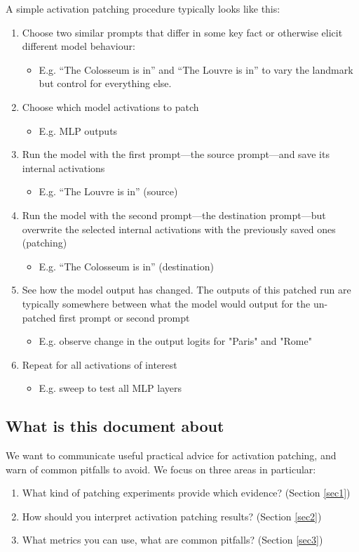 \documentclass[nonatbib]{article}
\begin{document}
A simple activation patching procedure typically looks like this:
\begin{enumerate}
  \item Choose two similar prompts that differ in some key fact or otherwise elicit different model behaviour:
  \begin{itemize}
    \item[] E.g. “The Colosseum is in” and “The Louvre is in” to vary the landmark but control for everything else.
  \end{itemize}
  \item Choose which model activations to patch
  \begin{itemize}
    \item[] E.g. MLP outputs
  \end{itemize}
  \item Run the model with the first prompt—the source prompt—and save its internal activations
  \begin{itemize}
    \item[] E.g. “The Louvre is in” (source)
  \end{itemize}
  \item Run the model with the second prompt—the destination prompt—but overwrite the selected internal activations with the previously saved ones (patching)
  \begin{itemize}
    \item[] E.g. “The Colosseum is in” (destination)
  \end{itemize}
  \item See how the model output has changed. The outputs of this patched run are typically somewhere between what the model would output for the un-patched first prompt or second prompt
  \begin{itemize}
    \item[] E.g. observe change in the output logits for "Paris" and "Rome"
  \end{itemize}
  \item Repeat for all activations of interest
  \begin{itemize}
    \item[] E.g. sweep to test all MLP layers
  \end{itemize}
\end{enumerate}

\subsection{What is this document about}
We want to communicate useful practical advice for activation patching, and warn of common pitfalls to avoid. We focus on three areas in particular:
\begin{enumerate}
    \item What kind of patching experiments provide which evidence? (Section \ref{sec1})
    \item How should you interpret activation patching results? (Section \ref{sec2})
    \item What metrics you can use, what are common pitfalls? (Section \ref{sec3})
\end{enumerate}
\end{document}
